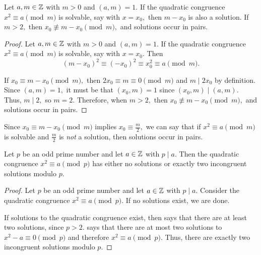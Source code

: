 \documentclass{ximera}
\begin{document}
\begin{lemma}\label{lem:roots-pairs}
    Let $a,m\in\mathbb Z$ with $m>0$ and $(a,m)=1.$ If the quadratic congruence $x^2\equiv a\pmod{m}$ is solvable, say with $x=x_0,$ then  $m-x_0$ is also a solution. If $m\gt 2,$ then $x_0\not\equiv m-x_0\pmod{m},$ and solutions occur in pairs.
\end{lemma}

\begin{proof}
    Let $a,m\in\mathbb Z$ with $m>0$ and $(a,m)=1.$ If the quadratic congruence $x^2\equiv a\pmod{m}$ is solvable, say with $x=x_0.$ Then 
    \[(m-x_0)^2\equiv (-x_0)^2\equiv x_0^2\equiv a\pmod{m}.\]
    
    If $x_0\equiv m-x_0\pmod{m},$ then $2x_0\equiv m\equiv 0 \pmod{m}$ and $m\mid 2x_0$ by definition. Since $(a,m)=1,$ it must be that $(x_0,m)=1$ since $(x_0,m)\mid(a,m).$ Thus, $m\mid 2,$ so $m=2.$ Therefore, when  $m\gt 2,$ then $x_0\not\equiv m-x_0\pmod{m},$ and solutions occur in pairs.
\end{proof}


\begin{remark}
    Since $x_0\equiv m-x_0\pmod{m}$ implies $x_0\equiv \frac{m}{2},$ we can say that if $x^2\equiv a\pmod{m}$ is solvable and $\frac{m}{2}$ is \emph{not} a solution, then solutions occur in pairs.
\end{remark}

\begin{proposition}[Proposition 4.1]\label{prop:number-sqrts}
    Let $p$ be an odd prime number and let $a\in\mathbb Z$ with $p\mid a.$ Then the quadratic congruence $x^2\equiv a\pmod{p}$ has either no solutions or exactly two incongruent solutions modulo $p$.
\end{proposition}

\begin{proof}
	Let $p$ be an odd prime number and let $a\in\mathbb Z$ with $p\mid a.$ Consider the quadratic congruence $x^2\equiv a\pmod{p}.$ If no solutions exist, we are done.
	
	If solutions to the quadratic congruence exist, then  says that there are at least two solutions, since $p>2.$  says that there are at most two solutions to $x^2-a\equiv 0\pmod{p}$ and therefore $x^2\equiv a\pmod{p}.$ Thus, there are exactly two incongruent solutions modulo $p.$
\end{proof}
\end{document}
